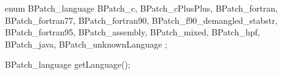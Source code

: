 \begin{apient}
  enum BPatch_language {
    BPatch_c,
    BPatch_cPlusPlus,
    BPatch_fortran,
    BPatch_fortran77,
    BPatch_fortran90,
    BPatch_f90_demangled_stabstr,
    BPatch_fortran95,
    BPatch_assembly,
    BPatch_mixed,
    BPatch_hpf,
    BPatch_java,
    BPatch_unknownLanguage
  };
\end{apient}


\begin{apient}
  BPatch_language getLanguage();
\end{apient}

